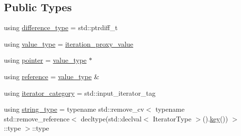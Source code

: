 \subsection*{Public Types}
\begin{DoxyCompactItemize}
\item 
using \hyperlink{classnlohmann_1_1detail_1_1iteration__proxy__value_ada6b4e6d55d8ed7ac79e49a03e9d1fe2}{difference\+\_\+type} = std\+::ptrdiff\+\_\+t
\item 
using \hyperlink{classnlohmann_1_1detail_1_1iteration__proxy__value_a5e90a5810cc1bb6c1000eabbfdfe7b9e}{value\+\_\+type} = \hyperlink{classnlohmann_1_1detail_1_1iteration__proxy__value}{iteration\+\_\+proxy\+\_\+value}
\item 
using \hyperlink{classnlohmann_1_1detail_1_1iteration__proxy__value_a44c64feee85b8e7164a05310e6418a4b}{pointer} = \hyperlink{classnlohmann_1_1detail_1_1iteration__proxy__value_a5e90a5810cc1bb6c1000eabbfdfe7b9e}{value\+\_\+type} $\ast$
\item 
using \hyperlink{classnlohmann_1_1detail_1_1iteration__proxy__value_a5bc7d3133daab5ec4797f3132e093af8}{reference} = \hyperlink{classnlohmann_1_1detail_1_1iteration__proxy__value_a5e90a5810cc1bb6c1000eabbfdfe7b9e}{value\+\_\+type} \&
\item 
using \hyperlink{classnlohmann_1_1detail_1_1iteration__proxy__value_a1ab8c44e3772c03651b5ad07216043cf}{iterator\+\_\+category} = std\+::input\+\_\+iterator\+\_\+tag
\item 
using \hyperlink{classnlohmann_1_1detail_1_1iteration__proxy__value_a1fc63b88a585fa39942007aab69a74e6}{string\+\_\+type} = typename std\+::remove\+\_\+cv$<$ typename std\+::remove\+\_\+reference$<$ decltype(std\+::declval$<$ Iterator\+Type $>$().\hyperlink{classnlohmann_1_1detail_1_1iteration__proxy__value_ad8c7b5e34249ecc6624d3fb8d9200277}{key}()) $>$\+::type $>$\+::type
\end{DoxyCompactItemize}
